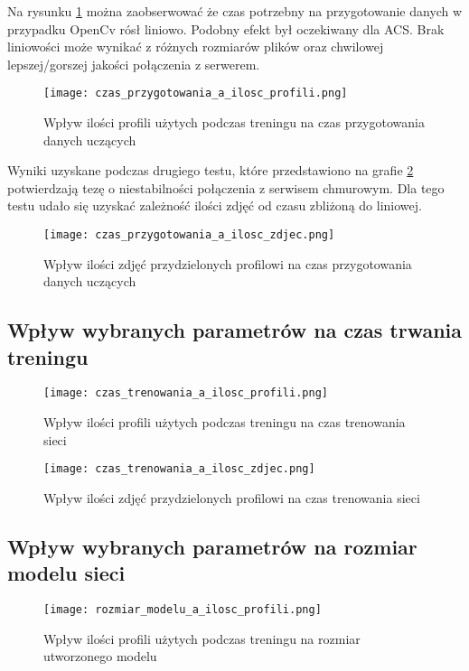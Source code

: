 Na rysunku \ref{fig:czas_p_profile} można zaobserwować że czas potrzebny na przygotowanie danych w przypadku OpenCv rósł liniowo. Podobny efekt był oczekiwany dla ACS. Brak liniowości może wynikać z różnych rozmiarów plików oraz chwilowej lepszej/gorszej jakości połączenia z serwerem.
\begin{figure}[H]
	\centering
	\texttt{[image: czas\_przygotowania\_a\_ilosc\_profili.png]}
	\caption{Wpływ ilości profili użytych podczas treningu na czas przygotowania danych uczących}
	\label{fig:czas_p_profile}
\end{figure}
Wyniki uzyskane podczas drugiego testu, które przedstawiono na grafie \ref{fig:czas_p_zdjecia} potwierdzają tezę o niestabilności połączenia z serwisem chmurowym. Dla tego testu udało się uzyskać zależność ilości zdjęć od czasu zbliżoną do liniowej.
\begin{figure}[H]
	\centering
	\texttt{[image: czas\_przygotowania\_a\_ilosc\_zdjec.png]}
	\caption{Wpływ ilości zdjęć przydzielonych profilowi na czas przygotowania danych uczących}
	\label{fig:czas_p_zdjecia}
\end{figure}

\subsection{Wpływ wybranych parametrów na czas trwania treningu}
\begin{figure}[H]
	\centering
	\texttt{[image: czas\_trenowania\_a\_ilosc\_profili.png]}
	\caption{Wpływ ilości profili użytych podczas treningu na czas trenowania sieci}
	\label{fig:czas_t_profile}
\end{figure}

\begin{figure}[H]
	\centering
	\texttt{[image: czas\_trenowania\_a\_ilosc\_zdjec.png]}
	\caption{Wpływ ilości zdjęć przydzielonych profilowi na czas trenowania sieci}
	\label{fig:czas_t_zdjecia}
\end{figure}

\subsection{Wpływ wybranych parametrów na rozmiar modelu sieci}
\begin{figure}[H]
	\centering
	\texttt{[image: rozmiar\_modelu\_a\_ilosc\_profili.png]}
	\caption{Wpływ ilości profili użytych podczas treningu na rozmiar utworzonego modelu}
	\label{fig:rozmiar_profile}
\end{figure}

